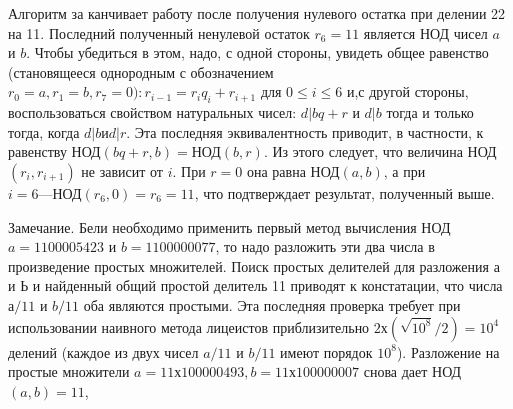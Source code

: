 \documentclass{mai_book}
\begin{document}
    Алгоритм за канчивает работу после получения нулевого остатка при делении 22 на 11. Последний полученный ненулевой остаток $r_6 = 11$ является НОД чисел $a$ и $b$. Чтобы убедиться в этом, надо, с одной стороны, увидеть общее равенство (становящееся однородным с обозначением $r_0 = a, r_1 = b, r_7 = 0): r_{i-1} = r_iq_i + r_{i+1}$ для $0\leqslant i\leqslant 6$ и,с другой стороны, воспользоваться свойством натуральных чисел: $d| bq+r \text{ и } d | b$ тогда и только тогда, когда $d | b \text{и} d | r$. Эта последняя эквивалентность приводит, в частности, к равенству НОД$(bq + r,b) = \text{НОД}(b, r)$. Из этого следует, что величина НОД$(r_i,r_{i+1})$ не зависит от $i$. При $r = 0$ она равна НОД$(a, b)$, а при $i = 6 — \text{НОД}(r_6,0) = r_6 = 11$, что подтверждает результат, полученный выше.
    \begin{center}
    \parbox{12cm}{
    Замечание. Бели необходимо применить первый метод вычисления НОД $a = 1100 005 423$ и $b = 1100 000 077$, то надо разложить эти два числа в произведение простых множителей. Поиск простых делителей для разложения а и Ь и найденный общий простой делитель 11 приводят к констатации, что числа $а/11$ и $b/11$ оба являются простыми. Эта последняя проверка требует при использовании наивного метода лицеистов приблизительно $2 х (\sqrt{10^8}/2) = 10^4$ делений (каждое из двух чисел $a/11$ и $b/11$ имеют порядок $10^8$). Разложение на простые множители $a = 11 х 100 000 493, b = 11 х 100 000 007$ снова дает НОД$(a, b) = 11$,}
\end{center}
\end{document}
